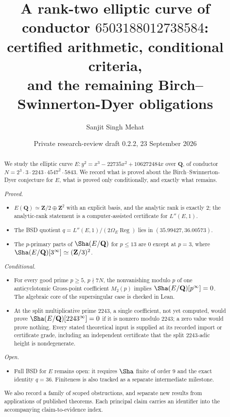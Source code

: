 \documentclass[11pt]{amsart}
\title[A rank-two elliptic curve: certified arithmetic and remaining BSD obligations]{A rank-two elliptic curve of conductor $6503188012738584$:\\ certified arithmetic, conditional criteria,\\ and the remaining Birch--Swinnerton-Dyer obligations}
\author{Sanjit Singh Mehat}
\date{Private research-review draft 0.2.2, 23 September 2026}
\newcommand{\Q}{\mathbf{Q}}
\newcommand{\Z}{\mathbf{Z}}
\newcommand{\Reg}{\operatorname{Reg}}
\theoremstyle{plain}
\theoremstyle{definition}
\theoremstyle{remark}
\begin{document}
\begin{abstract}
We study the elliptic curve $E\colon y^2=x^3-22735x^2+106272484x$ over $\Q$, of conductor $N=2^3\cdot3\cdot2243\cdot4547^2\cdot5843$. We record what is proved about the Birch--Swinnerton-Dyer conjecture for $E$, what is proved only conditionally, and exactly what remains.

\emph{Proved.}
\begin{itemize}[leftmargin=*]
\item $E(\Q)\simeq\Z/2\oplus\Z^2$ with an explicit basis, and the analytic rank is exactly $2$; the analytic-rank statement is a computer-assisted certificate for $L''(E,1)$.
\item The BSD quotient $q=L''(E,1)/(2\Omega_E\Reg)$ lies in $(35.99427,36.00573)$.
\item The $p$-primary parts of $\Sha(E/\Q)$ for $p\le13$ are $0$ except at $p=3$, where $\Sha(E/\Q)[3^\infty]\simeq(\Z/3)^2$.
\end{itemize}

\emph{Conditional.}
\begin{itemize}[leftmargin=*]
\item For every good prime $p\ge5$, $p\nmid7N$, the nonvanishing modulo $p$ of one anticyclotomic Gross-point coefficient $M_2(p)$ implies $\Sha(E/\Q)[p^\infty]=0$. The algebraic core of the supersingular case is checked in Lean.
\item At the split multiplicative prime $2243$, a single coefficient, not yet computed, would prove $\Sha(E/\Q)[2243^\infty]=0$ if it is nonzero modulo $2243$; a zero value would prove nothing. Every stated theoretical input is supplied at its recorded import or certificate grade, including an independent certificate that the split $2243$-adic height is nondegenerate.
\end{itemize}

\emph{Open.}
\begin{itemize}[leftmargin=*]
\item Full BSD for $E$ remains open: it requires $\Sha$ finite of order $9$ and the exact identity $q=36$. Finiteness is also tracked as a separate intermediate milestone.
\end{itemize}

We also record a family of scoped obstructions, and separate new results from applications of published theorems. Each principal claim carries an identifier into the accompanying claim-to-evidence index.
\end{abstract}
\end{document}
